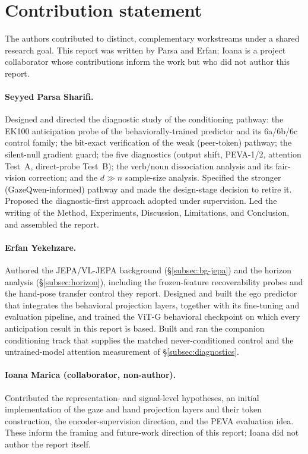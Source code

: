 \section{Contribution statement}
\label{sec:contrib}

The authors contributed to distinct, complementary workstreams under a shared
research goal. This report was written by Parsa and Erfan; Ioana is a project
collaborator whose contributions inform the work but who did not author this
report.

\paragraph{Seyyed Parsa Sharifi.}
Designed and directed the diagnostic study of the conditioning pathway: the EK100
anticipation probe of the behaviorally-trained predictor and its 6a/6b/6c control
family; the bit-exact verification of the weak (peer-token) pathway; the
silent-null gradient guard; the five diagnostics (output shift, PEVA-1/2,
attention Test~A, direct-probe Test~B); the verb/noun dissociation analysis and
its fair-vision correction; and the $d\gg n$ sample-size analysis. Specified the
stronger (GazeQwen-informed) pathway and made the design-stage decision to retire
it. Proposed the diagnostic-first approach adopted under supervision. Led the writing of the Method, Experiments, Discussion, Limitations, and Conclusion, and assembled the report.

\paragraph{Erfan Yekehzare.}
Authored the JEPA/VL-JEPA background (\S\ref{subsec:bg-jepa}) and the horizon
analysis (\S\ref{subsec:horizon}), including the frozen-feature recoverability
probes and the hand-pose transfer control they report. Designed and built the ego predictor that integrates
the behavioral projection layers, together with its fine-tuning and evaluation
pipeline, and trained the ViT-G behavioral checkpoint on which every anticipation
result in this report is based. Built and ran the companion conditioning track
that supplies the matched never-conditioned control and the untrained-model
attention measurement of \S\ref{subsec:diagnostics}.

\paragraph{Ioana Marica (collaborator, non-author).}
Contributed the representation- and signal-level hypotheses, an initial
implementation of the gaze and hand projection layers and their token
construction, the encoder-supervision direction, and the PEVA evaluation idea. These inform the framing and future-work
direction of this report; Ioana did not author the report itself.